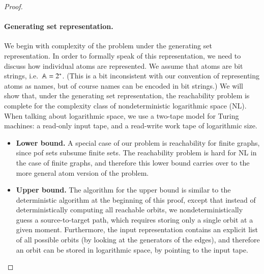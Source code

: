 \begin{proof}
\paragraph*{Generating set representation.}
We begin with complexity of the problem under the generating set representation. In order to formally speak of this representation, we need to discuss how individual atoms are represented. We assume that atoms are bit strings, i.e.~$\mathbb A = 2^*$. (This is a bit inconsistent with our convention of representing atoms as names, but of course names can be encoded in bit strings.) We will show that, under the generating set representation,  the reachability problem is complete for  the complexity class of nondeterministic logarithmic space (NL). When talking about logarithmic space, we  use a two-tape model for Turing machines: a read-only input tape, and a read-write work tape of logarithmic size. 
\begin{itemize}
    \item \textbf{Lower bound.} A special case of our problem is reachability for finite graphs, since pof sets subsume finite sets. The reachability problem is hard for NL in the case of finite graphs, and therefore this lower bound carries over to the more general atom version of the problem. 
    \item \textbf{Upper bound.} The algorithm for the upper bound is similar to the deterministic algorithm at the beginning of this proof, except that instead of deterministically computing all reachable orbits, we nondeterministically guess a source-to-target path, which requires storing only a single orbit at a given moment. Furthermore, the input representation contains an explicit list of all possible orbits (by looking at the generators of the edges), and therefore an orbit can be stored in logarithmic space, by pointing to the input tape. 
    

\end{itemize}
\end{proof}
